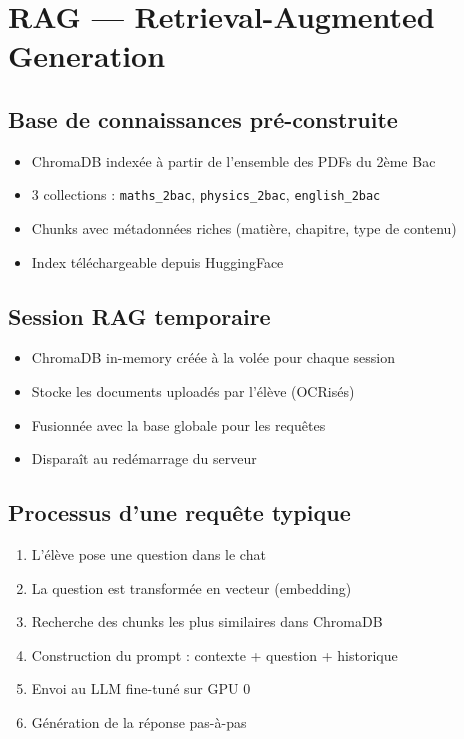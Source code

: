 \documentclass[12pt,a4paper]{report}
\begin{document}
\section{RAG — Retrieval-Augmented Generation}

\subsection{Base de connaissances pré-construite}
\begin{itemize}
    \item ChromaDB indexée à partir de l'ensemble des PDFs du 2ème Bac
    \item 3 collections : \texttt{maths\_2bac}, \texttt{physics\_2bac}, \texttt{english\_2bac}
    \item Chunks avec métadonnées riches (matière, chapitre, type de contenu)
    \item Index téléchargeable depuis HuggingFace
\end{itemize}

\subsection{Session RAG temporaire}
\begin{itemize}
    \item ChromaDB in-memory créée à la volée pour chaque session
    \item Stocke les documents uploadés par l'élève (OCRisés)
    \item Fusionnée avec la base globale pour les requêtes
    \item Disparaît au redémarrage du serveur
\end{itemize}

\subsection{Processus d'une requête typique}
\begin{enumerate}
    \item L'élève pose une question dans le chat
    \item La question est transformée en vecteur (embedding)
    \item Recherche des chunks les plus similaires dans ChromaDB
    \item Construction du prompt : contexte + question + historique
    \item Envoi au LLM fine-tuné sur GPU 0
    \item Génération de la réponse pas-à-pas
\end{enumerate}
\end{document}

